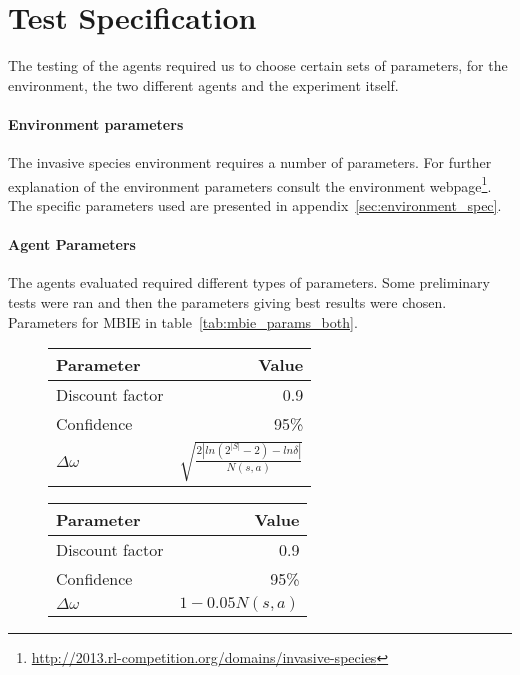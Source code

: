 \section{Test Specification }
\label{sec:test_spec}

The testing of the agents required us to choose certain sets of parameters, for the environment, the two different agents and the experiment itself. 

\paragraph{Environment parameters}
The invasive species environment requires a number of parameters. For further explanation of the environment parameters consult the environment webpage\footnote{\url{http://2013.rl-competition.org/domains/invasive-species}}. The specific parameters used are presented in appendix~\ref{sec:environment_spec}.


\paragraph{Agent Parameters}

The agents evaluated required different types of parameters. Some preliminary tests were ran and then the parameters giving best results were chosen. Parameters for MBIE in table~\ref{tab:mbie_params_both}.

\begin{table}[H]
\centering
{}
\label{tab:mbie_params_both}

\begin{subfigure}[b]{0.47\textwidth}
    \centering
    \label{tab:mbie_params} 
    \begin{tabular}{lr}
     \toprule
     Parameter & Value \\
     \midrule
     Discount factor & 0.9 \\
     Confidence & 95\% \\
     $\Delta \omega$ & $\sqrt{\frac{2|ln(2^{|S|}-2) - ln  \delta |}{N(s,a)}}$ \\
     
     \bottomrule
    \end{tabular}
\end{subfigure}
\quad
\begin{subfigure}[b]{0.47\textwidth}
    \centering
    \label{tab:mbie_realistic_params}
    \begin{tabular}{lr}
     \toprule
     Parameter & Value \\
     \midrule
     Discount factor & 0.9 \\
     Confidence & 95\% \\
     $\Delta \omega$ & $1 - 0.05 N(s,a)$ \\
     \bottomrule
    \end{tabular}
\end{subfigure}
\end{table}

